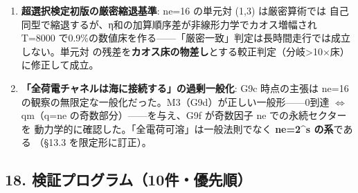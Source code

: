 \documentclass[
]{ltjarticle}
\begin{document}
\begin{enumerate}
  が最大2倍深化）。基準巻きを
  頂点到達不能（m\_ref=5）に変えて分離------計器学原則5（§11）として確立。
\item
  \textbf{超選択検定初版の厳密縮退基準}: ne=16 の単元対 (1,3)
  は厳密算術では
  自己同型で縮退するが、η和の加算順序差が非線形力学でカオス増幅され
  T=8000
  で0.9\%の数値床を作る------「厳密一致」判定は長時間走行では成立しない。単元対
  の残差を\textbf{カオス床の物差し}とする較正判定（分岐\textgreater10×床）に修正して成立。
\item
  \textbf{「全荷電チャネルは海に接続する」の過剰一般化}: G9c
  時点の主張は ne=16
  の観察の無限定な一般化だった。M3（G9d）が正しい一般形------0到達
  \(\Leftrightarrow\) q\textbar m（q=ne の奇数部分）------を与え、G9f
  が奇数因子 ne での永続セクターを
  動力学的に確認した。「全電荷可溶」は一般法則でなく \textbf{ne=2\^{}s
  の系}である （§13.3 を限定形に訂正）。
\end{enumerate}

\subsection{18.
検証プログラム（10件・優先順）}\label{ux691cux8a3cux30d7ux30edux30b0ux30e9ux30e010ux4ef6ux512aux5148ux9806}
\end{document}
